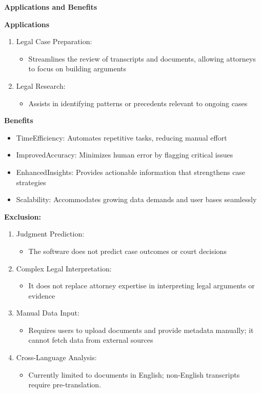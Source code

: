 \documentclass[12pt]{article}
\begin{document}
\begin{itemize}
\textbf{Applications and Benefits }

 \textbf{Applications}
\begin{enumerate}
    \item Legal Case Preparation:
	\begin{itemize}
	 	\item  Streamlines the review of transcripts and documents, allowing attorneys to focus on
 			building arguments
	\end{itemize}
    \item  Legal Research:
	\begin{itemize}
		 \item Assists in identifying patterns or precedents relevant to ongoing cases
	\end{itemize}
\end{enumerate}

\textbf{Benefits }
\begin{itemize}
  \item   TimeEfficiency: Automates repetitive tasks, reducing manual effort
  \item  ImprovedAccuracy: Minimizes human error by flagging critical issues
  \item  EnhancedInsights: Provides actionable information that strengthens case strategies
 \item  Scalability: Accommodates growing data demands and user bases seamlessly
\end{itemize}


 \textbf{Exclusion:}
\begin{enumerate}
    \item Judgment Prediction:
	\begin{itemize}
	 	\item   The software does not predict case outcomes or court decisions
	\end{itemize}
    \item Complex Legal Interpretation:
	\begin{itemize}
		 \item  It does not replace attorney expertise in interpreting legal arguments or evidence
	\end{itemize}
    \item  Manual Data Input:
	\begin{itemize}
		 \item   Requires users to upload documents and provide metadata manually; it cannot fetch data
 from external sources
	\end{itemize}
    \item  Cross-Language Analysis:
	\begin{itemize}
		 \item   Currently limited to documents in English; non-English transcripts require
 pre-translation.
	\end{itemize}
\end{enumerate}
\end{itemize}
\end{document}
